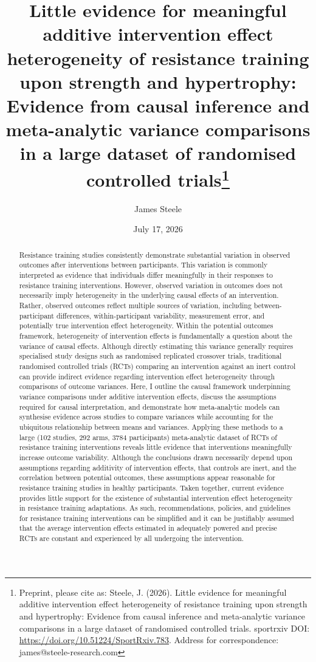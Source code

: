 \documentclass[
]{article}
\title{Little evidence for meaningful additive intervention effect
heterogeneity of resistance training upon strength and hypertrophy:
Evidence from causal inference and meta-analytic variance comparisons in
a large dataset of randomised controlled trials\thanks{Preprint, please
cite as: Steele, J. (2026). Little evidence for meaningful additive
intervention effect heterogeneity of resistance training upon strength
and hypertrophy: Evidence from causal inference and meta-analytic
variance comparisons in a large dataset of randomised controlled trials.
sportrxiv DOI: \url{https://doi.org/10.51224/SportRxiv.783}. Address for
correspondence: james@steele-research.com}}
\author[1,2,3]{James Steele}
\affil[1]{Steele Research Limited, Eastleigh, Hampshire, UK}
\affil[2]{MacroFactor, Stronger by Science Technologies LLC, Raleigh,
North Carolina, USA}
\affil[3]{School of Health and Biomedical Sciences, Royal Melbourne
Institute of Technology, Melbourne, VIC, Australia}
\date{July 17, 2026}
\begin{document}
\maketitle
\begin{abstract}
Resistance training studies consistently demonstrate substantial
variation in observed outcomes after interventions between participants.
This variation is commonly interpreted as evidence that individuals
differ meaningfully in their responses to resistance training
interventions. However, observed variation in outcomes does not
necessarily imply heterogeneity in the underlying causal effects of an
intervention. Rather, observed outcomes reflect multiple sources of
variation, including between-participant differences, within-participant
variability, measurement error, and potentially true intervention effect
heterogeneity. Within the potential outcomes framework, heterogeneity of
intervention effects is fundamentally a question about the variance of
causal effects. Although directly estimating this variance generally
requires specialised study designs such as randomised replicated
crossover trials, traditional randomised controlled trials (RCTs)
comparing an intervention against an inert control can provide indirect
evidence regarding intervention effect heterogeneity through comparisons
of outcome variances. Here, I outline the causal framework underpinning
variance comparisons under additive intervention effects, discuss the
assumptions required for causal interpretation, and demonstrate how
meta-analytic models can synthesise evidence across studies to compare
variances while accounting for the ubiquitous relationship between means
and variances. Applying these methods to a large (102 studies, 292 arms,
3784 participants) meta-analytic dataset of RCTs of resistance training
interventions reveals little evidence that interventions meaningfully
increase outcome variability. Although the conclusions drawn necessarily
depend upon assumptions regarding additivity of intervention effects,
that controls are inert, and the correlation between potential outcomes,
these assumptions appear reasonable for resistance training studies in
healthy participants. Taken together, current evidence provides little
support for the existence of substantial intervention effect
heterogeneity in resistance training adaptations. As such,
recommendations, policies, and guidelines for resistance training
interventions can be simplified and it can be justifiably assumed that
the average intervention effects estimated in adequately powered and
precise RCTs are constant and experienced by all undergoing the
intervention.
\end{abstract}
\end{document}

